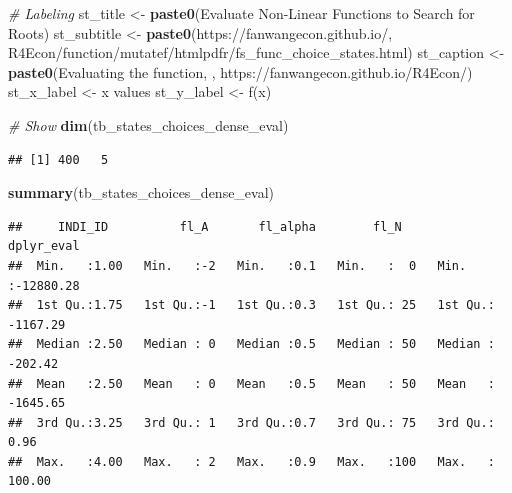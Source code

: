 \documentclass[
]{book}
\newenvironment{Shaded}{\begin{snugshade}}{\end{snugshade}}
\newcommand{\CommentTok}[1]{\textcolor[rgb]{0.56,0.35,0.01}{\textit{#1}}}
\newcommand{\KeywordTok}[1]{\textcolor[rgb]{0.13,0.29,0.53}{\textbf{#1}}}
\newcommand{\NormalTok}[1]{#1}
\newcommand{\StringTok}[1]{\textcolor[rgb]{0.31,0.60,0.02}{#1}}
\begin{document}
\begin{Shaded}
\begin{Highlighting}[]
\CommentTok{\# Labeling}
\NormalTok{st\_title \textless{}{-}}\StringTok{ }\KeywordTok{paste0}\NormalTok{(}\StringTok{\textquotesingle{}Evaluate Non{-}Linear Functions to Search for Roots\textquotesingle{}}\NormalTok{)}
\NormalTok{st\_subtitle \textless{}{-}}\StringTok{ }\KeywordTok{paste0}\NormalTok{(}\StringTok{\textquotesingle{}https://fanwangecon.github.io/\textquotesingle{}}\NormalTok{,}
                      \StringTok{\textquotesingle{}R4Econ/function/mutatef/htmlpdfr/fs\_func\_choice\_states.html\textquotesingle{}}\NormalTok{)}
\NormalTok{st\_caption \textless{}{-}}\StringTok{ }\KeywordTok{paste0}\NormalTok{(}\StringTok{\textquotesingle{}Evaluating the function, \textquotesingle{}}\NormalTok{,}
                     \StringTok{\textquotesingle{}https://fanwangecon.github.io/R4Econ/\textquotesingle{}}\NormalTok{)}
\NormalTok{st\_x\_label \textless{}{-}}\StringTok{ \textquotesingle{}x values\textquotesingle{}}
\NormalTok{st\_y\_label \textless{}{-}}\StringTok{ \textquotesingle{}f(x)\textquotesingle{}}

\CommentTok{\# Show}
\KeywordTok{dim}\NormalTok{(tb\_states\_choices\_dense\_eval)}
\end{Highlighting}
\end{Shaded}

\begin{verbatim}
## [1] 400   5
\end{verbatim}

\begin{Shaded}
\begin{Highlighting}[]
\KeywordTok{summary}\NormalTok{(tb\_states\_choices\_dense\_eval)}
\end{Highlighting}
\end{Shaded}

\begin{verbatim}
##     INDI_ID          fl_A       fl_alpha        fl_N       dplyr_eval       
##  Min.   :1.00   Min.   :-2   Min.   :0.1   Min.   :  0   Min.   :-12880.28  
##  1st Qu.:1.75   1st Qu.:-1   1st Qu.:0.3   1st Qu.: 25   1st Qu.: -1167.29  
##  Median :2.50   Median : 0   Median :0.5   Median : 50   Median :  -202.42  
##  Mean   :2.50   Mean   : 0   Mean   :0.5   Mean   : 50   Mean   : -1645.65  
##  3rd Qu.:3.25   3rd Qu.: 1   3rd Qu.:0.7   3rd Qu.: 75   3rd Qu.:     0.96  
##  Max.   :4.00   Max.   : 2   Max.   :0.9   Max.   :100   Max.   :   100.00
\end{verbatim}
\end{document}
